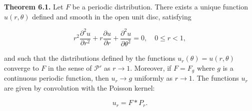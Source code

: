 \textbf{Theorem 6.1.} Let $F$ be a periodic distribution. There exists a unique function $u(r, \theta)$ defined and smooth in the open unit disc, satisfying

$$r^2 \frac{\partial^2 u}{\partial r^2} + r \frac{\partial u}{\partial r} + \frac{\partial^2 u}{\partial \theta^2} = 0, \quad 0 \leq r < 1,$$

and such that the distributions defined by the functions $u_r(\theta) = u(r, \theta)$ converge to $F$ in the sense of $\mathcal{P}'$ as $r \to 1$. Moreover, if $F = F_g$ where $g$ is a continuous periodic function, then $u_r \to g$ uniformly as $r \to 1$. The functions $u_r$ are given by convolution with the Poisson kernel:

$$u_r = F * P_r.$$
